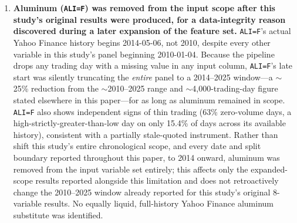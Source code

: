 \documentclass[journal]{IEEEtran}
\begin{document}
\begin{enumerate}
    \item \textbf{Aluminum (\texttt{ALI=F}) was removed from the input scope after this study's original results were produced, for a data-integrity reason discovered during a later expansion of the feature set.} \texttt{ALI=F}'s actual Yahoo Finance history begins 2014-05-06, not 2010, despite every other variable in this study's panel beginning 2010-01-04. Because the pipeline drops any trading day with a missing value in any input column, \texttt{ALI=F}'s late start was silently truncating the \emph{entire} panel to a 2014--2025 window---a $\sim$25\% reduction from the $\sim$2010--2025 range and $\sim$4,000-trading-day figure stated elsewhere in this paper---for as long as aluminum remained in scope. \texttt{ALI=F} also shows independent signs of thin trading (63\% zero-volume days, a high-strictly-greater-than-low day on only 15.4\% of days across its available history), consistent with a partially stale-quoted instrument. Rather than shift this study's entire chronological scope, and every date and split boundary reported throughout this paper, to 2014 onward, aluminum was removed from the input variable set entirely; this affects only the expanded-scope results reported alongside this limitation and does not retroactively change the 2010--2025 window already reported for this study's original 8-variable results. No equally liquid, full-history Yahoo Finance aluminum substitute was identified.

\end{enumerate}
\end{document}
